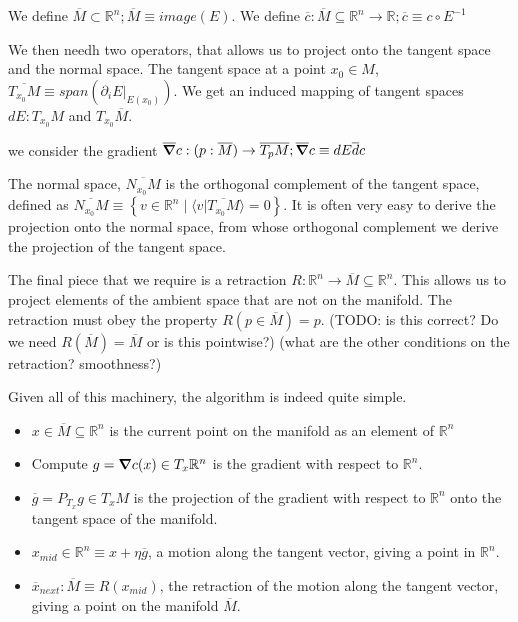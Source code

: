 \documentclass[11pt]{book}
\begin{document}
We define $\overline M \subset \mathbb R^n; \overline M \equiv image(E)$.
We define $\overline c: \overline M \subseteq \mathbb R^n \rightarrow \mathbb R; \overline c \equiv c \circ E^{-1}$

We then needh two operators, that allows us to project onto the tangent space
and the normal space. The tangent space at a point $x_0 \in M$, $\overline{T_{x_0} M} \equiv span(\partial_i E |_{E(x_0)})$. 
We get an induced mapping of tangent spaces $dE: T_{x_0} M$ and $T_{x_0} \overline M$.

we consider the gradient
$\overline \grad c : (p: \overline M) \rightarrow \overline{T_p M}; \overline \grad c \equiv dE \overline dc$

The normal space,
$\overline{N_{x_0} M}$ is the orthogonal complement of the tangent space, defined
as $\overline{N_{x_0} M} \equiv \left\{ v \in \mathbb R^n \mid \langle v | \overline{T_{x_0} M} \rangle = 0 \right\}$.
It is often very easy to derive the projection onto the normal space, from
whose orthogonal complement we derive the projection of the tangent space.

The final piece that we require is a retraction $R: \mathbb R^n \rightarrow \overline M \subseteq \mathbb R^n$. This allows
us to project elements of the ambient space that are not on the manifold. The
retraction must obey the property $R(p \in \overline M) = p$.
(TODO: is this correct? Do we need $R(\overline M) = \overline M$ or is this pointwise?)
(what are the other conditions on the retraction? smoothness?)

Given all of this machinery, the algorithm is indeed quite simple. 

\begin{itemize}
    \item $x \in \overline M \subseteq \mathbb R^n$ is the current point on the manifold as an element of $\mathbb R^n$
    \item Compute $g = \grad c(x) \in T_x \mathbb R^n$ is the gradient with respect to $\mathbb R^n$.
    \item $\overline g = P_{T_x} g \in T_x M$ is the projection of the gradient with respect to $\mathbb R^n$ onto the 
            tangent space of the manifold.
    \item $x_{mid}\in \mathbb R^n \equiv x + \eta \overline g$, a motion along the tangent vector, giving a point in
            $\mathbb R^n$.
    \item $\overline x_{next}: \overline M \equiv R(x_{mid})$, the retraction of the motion along the tangent vector,
        giving a point on the manifold $\overline M$.
\end{itemize}
\end{document}
